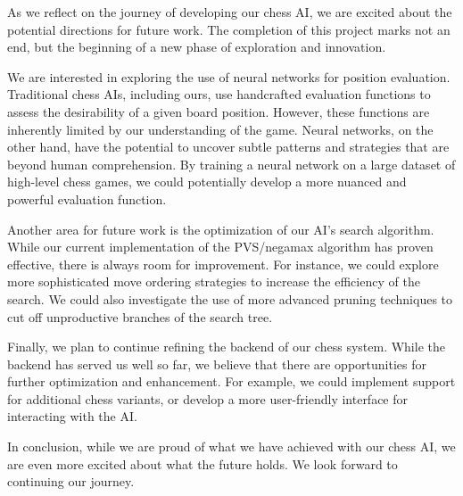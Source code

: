 As we reflect on the journey of developing our chess AI, we are excited about the potential directions for future work. The completion of this project marks not an end, but the beginning of a new phase of exploration and innovation.

We are interested in exploring the use of neural networks \cite{david2016deepchess} for position evaluation. Traditional chess AIs, including ours, use handcrafted evaluation functions to assess the desirability of a given board position. However, these functions are inherently limited by our understanding of the game. Neural networks, on the other hand, have the potential to uncover subtle patterns and strategies that are beyond human comprehension. By training a neural network on a large dataset of high-level chess games, we could potentially develop a more nuanced and powerful evaluation function.

Another area for future work is the optimization of our AI's search algorithm. While our current implementation of the PVS/negamax algorithm has proven effective, there is always room for improvement. For instance, we could explore more sophisticated move ordering strategies to increase the efficiency of the search. We could also investigate the use of more advanced pruning techniques to cut off unproductive branches of the search tree.

Finally, we plan to continue refining the backend of our chess system. While the backend has served us well so far, we believe that there are opportunities for further optimization and enhancement. For example, we could implement support for additional chess variants, or develop a more user-friendly interface for interacting with the AI.

In conclusion, while we are proud of what we have achieved with our chess AI, we are even more excited about what the future holds. We look forward to continuing our journey.
